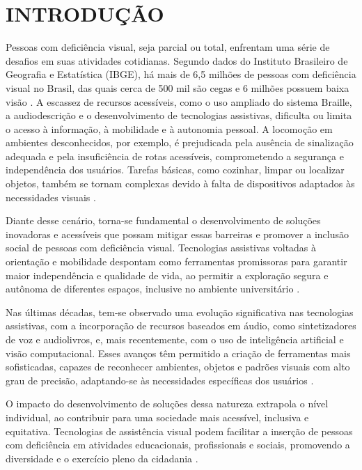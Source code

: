 \chapter{\textbf{INTRODUÇÃO}} 

Pessoas com deficiência visual, seja parcial ou total, enfrentam uma série de desafios em suas atividades cotidianas. Segundo dados do Instituto Brasileiro de Geografia e Estatística (IBGE), há mais de 6,5 milhões de pessoas com deficiência visual no Brasil, das quais cerca de 500 mil são cegas e 6 milhões possuem baixa visão \cite{Univali2024}. A escassez de recursos acessíveis, como o uso ampliado do sistema Braille, a audiodescrição e o desenvolvimento de tecnologias assistivas, dificulta ou limita o acesso à informação, à mobilidade e à autonomia pessoal. A locomoção em ambientes desconhecidos, por exemplo, é prejudicada pela ausência de sinalização adequada e pela insuficiência de rotas acessíveis, comprometendo a segurança e independência dos usuários. Tarefas básicas, como cozinhar, limpar ou localizar objetos, também se tornam complexas devido à falta de dispositivos adaptados às necessidades visuais \cite{alexandrino2017, depaula2008, pintanel2013}. 

Diante desse cenário, torna-se fundamental o desenvolvimento de soluções inovadoras e acessíveis que possam mitigar essas barreiras e promover a inclusão social de pessoas com deficiência visual. Tecnologias assistivas voltadas à orientação e mobilidade despontam como ferramentas promissoras para garantir maior independência e qualidade de vida, ao permitir a exploração segura e autônoma de diferentes espaços, inclusive no ambiente universitário \cite{depaula2008}.

Nas últimas décadas, tem-se observado uma evolução significativa nas tecnologias assistivas, com a incorporação de recursos baseados em áudio, como sintetizadores de voz e audiolivros, e, mais recentemente, com o uso de inteligência artificial e visão computacional. Esses avanços têm permitido a criação de ferramentas mais sofisticadas, capazes de reconhecer ambientes, objetos e padrões visuais com alto grau de precisão, adaptando-se às necessidades específicas dos usuários \cite{soares2017}.

O impacto do desenvolvimento de soluções dessa natureza extrapola o nível individual, ao contribuir para uma sociedade mais acessível, inclusiva e equitativa. Tecnologias de assistência visual podem facilitar a inserção de pessoas com deficiência em atividades educacionais, profissionais e sociais, promovendo a diversidade e o exercício pleno da cidadania \cite{agarwal2021-learning_representations, depaula2008}.

